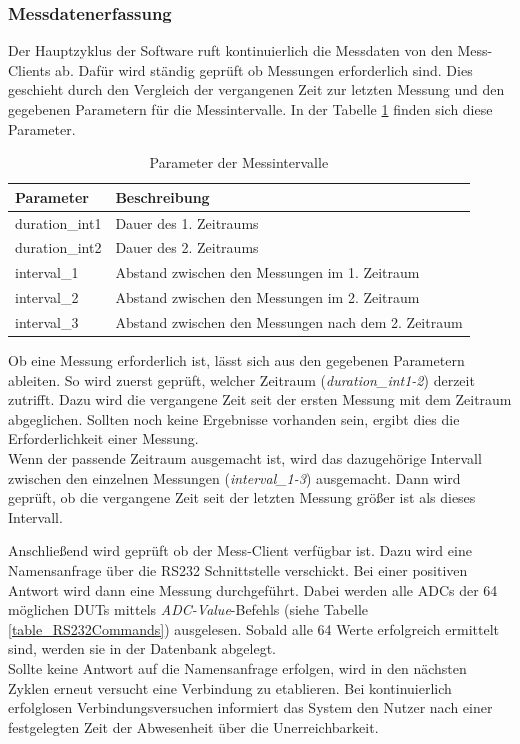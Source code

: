  
\subsubsection{Messdatenerfassung}

Der Hauptzyklus der Software ruft kontinuierlich die Messdaten von den Mess-Clients ab. Dafür wird ständig geprüft ob Messungen erforderlich sind. Dies geschieht durch den Vergleich der vergangenen Zeit zur letzten Messung und den gegebenen Parametern für die Messintervalle. In der Tabelle \ref{table_ParameterMessintervalle} finden sich diese Parameter.\\


\begin{table}[H]
\begin{center}
\begin{tabular}{|l|l|}\hline
Parameter & Beschreibung \\ \hline
duration\_int1 & Dauer des 1. Zeitraums\\  \hline
duration\_int2 & Dauer des 2. Zeitraums\\  \hline
interval\_1 & Abstand zwischen den Messungen im 1. Zeitraum\\  \hline
interval\_2 & Abstand zwischen den Messungen im 2. Zeitraum\\  \hline
interval\_3 & Abstand zwischen den Messungen nach dem 2. Zeitraum\\ \hline
\end{tabular}
\caption{Parameter der Messintervalle}
\label{table_ParameterMessintervalle}
\end{center}
\end{table}


Ob eine Messung erforderlich ist, lässt sich aus den gegebenen Parametern ableiten. So wird zuerst geprüft, welcher Zeitraum (\textit{duration\_int1-2}) derzeit zutrifft. Dazu wird die vergangene Zeit seit der ersten Messung mit dem Zeitraum abgeglichen. Sollten noch keine Ergebnisse vorhanden sein, ergibt dies die Erforderlichkeit einer Messung.\\ Wenn der passende Zeitraum ausgemacht ist, wird das dazugehörige Intervall zwischen den einzelnen Messungen (\textit{interval\_1-3}) ausgemacht. Dann wird geprüft, ob die vergangene Zeit seit der letzten Messung größer ist als dieses Intervall.\ 

Anschließend wird geprüft ob der Mess-Client verfügbar ist. Dazu wird eine Namensanfrage über die RS232 Schnittstelle verschickt. Bei einer positiven Antwort wird dann eine Messung durchgeführt. Dabei werden alle \acp{ADC} der 64 möglichen \acp{DUT} mittels \textit{ADC-Value}-Befehls (siehe Tabelle \ref{table_RS232Commands}) ausgelesen. Sobald alle 64 Werte erfolgreich ermittelt sind, werden sie in der Datenbank abgelegt. \\
Sollte keine Antwort auf die Namensanfrage erfolgen, wird in den nächsten Zyklen erneut versucht eine Verbindung zu etablieren. Bei kontinuierlich erfolglosen Verbindungsversuchen informiert das System den Nutzer nach einer festgelegten Zeit der Abwesenheit über die Unerreichbarkeit.
 

